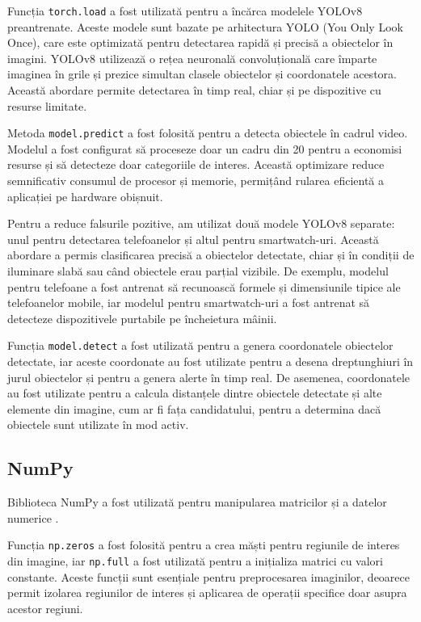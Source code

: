 \documentclass[12pt,a4paper]{article}
\begin{document}
Funcția \texttt{torch.load} a fost utilizată pentru a încărca modelele YOLOv8 preantrenate. Aceste modele sunt bazate pe arhitectura YOLO (You Only Look Once), care este optimizată pentru detectarea rapidă și precisă a obiectelor în imagini. YOLOv8 utilizează o rețea neuronală convoluțională care împarte imaginea în grile și prezice simultan clasele obiectelor și coordonatele acestora. Această abordare permite detectarea în timp real, chiar și pe dispozitive cu resurse limitate.

Metoda \texttt{model.predict} a fost folosită pentru a detecta obiectele în cadrul video. Modelul a fost configurat să proceseze doar un cadru din 20 pentru a economisi resurse și să detecteze doar categoriile de interes. Această optimizare reduce semnificativ consumul de procesor și memorie, permițând rularea eficientă a aplicației pe hardware obișnuit.

Pentru a reduce falsurile pozitive, am utilizat două modele YOLOv8 separate: unul pentru detectarea telefoanelor și altul pentru smartwatch-uri. Această abordare a permis clasificarea precisă a obiectelor detectate, chiar și în condiții de iluminare slabă sau când obiectele erau parțial vizibile. De exemplu, modelul pentru telefoane a fost antrenat să recunoască formele și dimensiunile tipice ale telefoanelor mobile, iar modelul pentru smartwatch-uri a fost antrenat să detecteze dispozitivele purtabile pe încheietura mâinii.

Funcția \texttt{model.detect} a fost utilizată pentru a genera coordonatele obiectelor detectate, iar aceste coordonate au fost utilizate pentru a desena dreptunghiuri în jurul obiectelor și pentru a genera alerte în timp real. De asemenea, coordonatele au fost utilizate pentru a calcula distanțele dintre obiectele detectate și alte elemente din imagine, cum ar fi fața candidatului, pentru a determina dacă obiectele sunt utilizate în mod activ.

\subsection{NumPy}
\hspace{6mm}Biblioteca NumPy a fost utilizată pentru manipularea matricilor și a datelor numerice \cite{numpy}. 

Funcția \texttt{np.zeros} a fost folosită pentru a crea măști pentru regiunile de interes din imagine, iar \texttt{np.full} a fost utilizată pentru a inițializa matrici cu valori constante. Aceste funcții sunt esențiale pentru preprocesarea imaginilor, deoarece permit izolarea regiunilor de interes și aplicarea de operații specifice doar asupra acestor regiuni.
\end{document}
